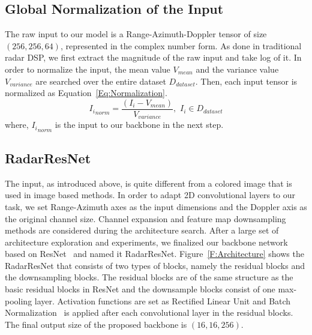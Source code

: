\documentclass[10pt, conference, compsocconf]{IEEEtran}
\begin{document}
\subsection{Global Normalization of the Input}

The raw input to our model is a Range-Azimuth-Doppler tensor of size $(256, 256, 64)$, represented in the complex number form. As done in traditional radar DSP, we first extract the magnitude of the raw input and take log of it. In order to normalize the input, the mean value $V_{mean}$ and the variance value $V_{variance}$ are searched over the entire dataset $D_{dataset}$. Then, each input tensor is normalized as Equation~\ref{Eq:Normalization}.
\begin{equation}
	{I_i}_{norm} = \frac{(I_{i} - V_{mean})}{V_{variance}},\,\, I_{i} \in D_{dataset}
	\label{Eq:Normalization}
\end{equation}
where, ${I_i}_{norm}$ is the input to our backbone in the next step.

\subsection{RadarResNet}

The input, as introduced above, is quite different from a colored image that is used in image based methods. In order to adapt 2D convolutional layers to our task, we set Range-Azimuth axes as the input dimensions and the Doppler axis as the original channel size. Channel expansion and feature map downsampling methods are considered during the architecture search. After a large set of architecture exploration and experiments, we finalized our backbone network based on ResNet~\cite{BG:ResNet} and named it RadarResNet. Figure~\ref{F:Architecture} shows the RadarResNet that consists of two types of blocks, namely the residual blocks and the downsampling blocks. The residual blocks are of the same structure as the basic residual blocks in ResNet and the downsample blocks consist of one max-pooling layer. Activation functions are set as Rectified Linear Unit and Batch Normalization~\cite{BG:BN} is applied after each convolutional layer in the residual blocks. The final output size of the proposed backbone is $(16, 16, 256)$.

\end{document}
